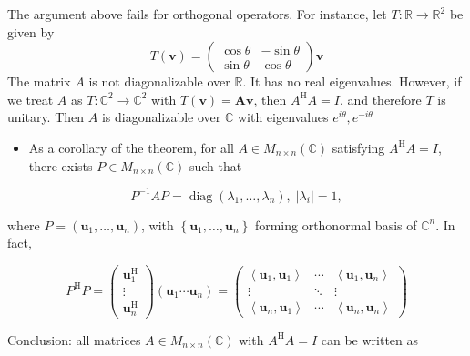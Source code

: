 The argument above fails for orthogonal operators. For instance, let \(
T : \mathbb{R} \rightarrow  {\mathbb{R}}^{2}
\) be given by 
\[
T\left( \mathbf{v}\right)  = \left( \begin{matrix} \cos \theta &  - \sin \theta \\  \sin \theta & \cos \theta  \end{matrix}\right) \mathbf{v}
\]
The matrix \(A\) is not diagonalizable over \(\mathbb{R}\). It has no real eigenvalues. However, if we treat \(A\) as \(T : {\mathbb{C}}^{2} \rightarrow  {\mathbb{C}}^{2}\) with \(T\left( \mathbf{v}\right)  = \mathbf{{Av}}\), then \({A}^{\mathrm{H}}A = I\), and therefore \(T\) is unitary. Then \(A\) is diagonalizable over \(\mathbb{C}\) with eigenvalues \({e}^{i\theta },{e}^{-{i\theta }}\)

\begin{itemize}
\item As a corollary of the theorem, for all \(A \in  {M}_{n \times  n}\left( \mathbb{C}\right)\) satisfying \({A}^{\mathrm{H}}A = I\), there exists \(P \in  {M}_{n \times  n}\left( \mathbb{C}\right)\) such that
\end{itemize}

\[
{P}^{-1}{AP} = \operatorname{diag}\left( {{\lambda }_{1},\ldots,{\lambda }_{n}}\right),\;\left| {\lambda }_{i}\right|  = 1,
\]

where \(P = \left( {{\mathbf{u}}_{1},\ldots,{\mathbf{u}}_{n}}\right)\), with \(\left\{  {{\mathbf{u}}_{1},\ldots,{\mathbf{u}}_{n}}\right\}\) forming orthonormal basis of \({\mathbb{C}}^{n}\). In fact,

\[
{P}^{\mathrm{H}}P = \left( \begin{matrix} {\mathbf{u}}_{1}^{\mathrm{H}} \\  \vdots \\  {\mathbf{u}}_{n}^{\mathrm{H}} \end{matrix}\right) \left( {{\mathbf{u}}_{1}\cdots {\mathbf{u}}_{n}}\right)  = \left( \begin{matrix} \left\langle  {{\mathbf{u}}_{1},{\mathbf{u}}_{1}}\right\rangle  & \cdots & \left\langle  {{\mathbf{u}}_{1},{\mathbf{u}}_{n}}\right\rangle  \\  \vdots &  \ddots  & \vdots \\  \left\langle  {{\mathbf{u}}_{n},{\mathbf{u}}_{1}}\right\rangle  & \cdots & \left\langle  {{\mathbf{u}}_{n},{\mathbf{u}}_{n}}\right\rangle   \end{matrix}\right)
\]

Conclusion: all matrices \(A \in  {M}_{n \times  n}\left( \mathbb{C}\right)\) with \({A}^{\mathrm{H}}A = I\) can be written as

